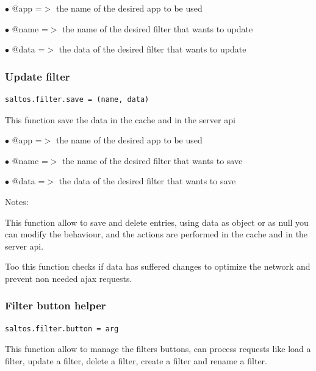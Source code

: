 \documentclass[a4paper]{article}
\begin{document}
\begin{compactitem}
\item[\color{myblue}$\bullet$] @app  =$>$ the name of the desired app to be used
\item[\color{myblue}$\bullet$] @name =$>$ the name of the desired filter that wants to update
\item[\color{myblue}$\bullet$] @data =$>$ the data of the desired filter that wants to update
\end{compactitem}

\hypertarget{toc212}{}
\subsubsection{Update filter}

\begin{lstlisting}
saltos.filter.save = (name, data)
\end{lstlisting}

This function save the data in the cache and in the server api

\begin{compactitem}
\item[\color{myblue}$\bullet$] @app  =$>$ the name of the desired app to be used
\item[\color{myblue}$\bullet$] @name =$>$ the name of the desired filter that wants to save
\item[\color{myblue}$\bullet$] @data =$>$ the data of the desired filter that wants to save
\end{compactitem}

Notes:

This function allow to save and delete entries, using data as object or as null
you can modify the behaviour, and the actions are performed in the cache and
in the server api.

Too this function checks if data has suffered changes to optimize the network
and prevent non needed ajax requests.

\hypertarget{toc213}{}
\subsubsection{Filter button helper}

\begin{lstlisting}
saltos.filter.button = arg
\end{lstlisting}

This function allow to manage the filters buttons, can process requests
like load a filter, update a filter, delete a filter, create a filter and
rename a filter.
\end{document}
